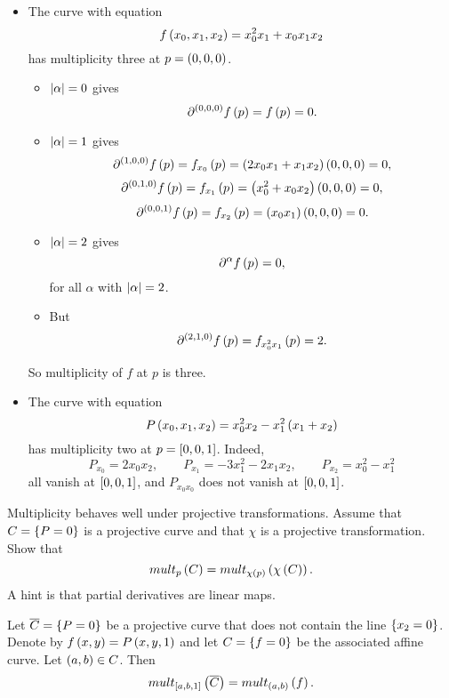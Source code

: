 \begin{example}
\hfill
\begin{itemize}
\item The curve with equation
$$ f\rb{x_0, x_1, x_2} = x_0^2x_1 + x_0x_1x_2 $$
has multiplicity three at $ p = \rb{0, 0, 0} $.
\begin{itemize}
\item $ \abs{\alpha} = 0 $ gives
$$ \partial^{\rb{0, 0, 0}} f\rb{p} = f\rb{p} = 0. $$
\item $ \abs{\alpha} = 1 $ gives
$$ \partial^{\rb{1, 0, 0}} f\rb{p} = f_{x_0}\rb{p} = \rb{2x_0x_1 + x_1x_2}\rb{0, 0, 0} = 0, $$
$$ \partial^{\rb{0, 1, 0}} f\rb{p} = f_{x_1}\rb{p} = \rb{x_0^2 + x_0x_2}\rb{0, 0, 0} = 0, $$
$$ \partial^{\rb{0, 0, 1}} f\rb{p} = f_{x_2}\rb{p} = \rb{x_0x_1}\rb{0, 0, 0} = 0. $$
\item $ \abs{\alpha} = 2 $ gives
$$ \partial^\alpha f\rb{p} = 0, $$
for all $ \alpha $ with $ \abs{\alpha} = 2 $.
\item But
$$ \partial^{\rb{2, 1, 0}} f\rb{p} = f_{x_0^2x_1}\rb{p} = 2. $$
\end{itemize}
So multiplicity of $ f $ at $ p $ is three.
\item The curve with equation
$$ P\rb{x_0, x_1, x_2} = x_0^2x_2 - x_1^2\rb{x_1 + x_2} $$
has multiplicity two at $ p = \sb{0, 0, 1} $. Indeed,
$$ P_{x_0} = 2x_0x_2, \qquad P_{x_1} = -3x_1^2 - 2x_1x_2, \qquad P_{x_2} = x_0^2 - x_1^2 $$
all vanish at $ \sb{0, 0, 1} $, and $ P_{x_0x_0} $ does not vanish at $ \sb{0, 0, 1} $.
\end{itemize}
\end{example}

\begin{exercise}
\label{ex:32}
Multiplicity behaves well under projective transformations. Assume that $ C = \cb{P = 0} $ is a projective curve and that $ \chi $ is a projective transformation. Show that
$$ mult_p\rb{C} = mult_{\chi\rb{p}}\rb{\chi\rb{C}}. $$
A hint is that partial derivatives are linear maps.
\end{exercise}

\begin{exercise}
\label{ex:33}
Let $ \overline{C} = \cb{P = 0} $ be a projective curve that does not contain the line $ \cb{x_2 = 0} $. Denote by $ f\rb{x, y} = P\rb{x, y, 1} $ and let $ C = \cb{f = 0} $ be the associated affine curve. Let $ \rb{a, b} \in C $. Then
$$ mult_{\sb{a, b, 1}}\rb{\overline{C}} = mult_{\rb{a, b}}\rb{f}. $$
\end{exercise}

